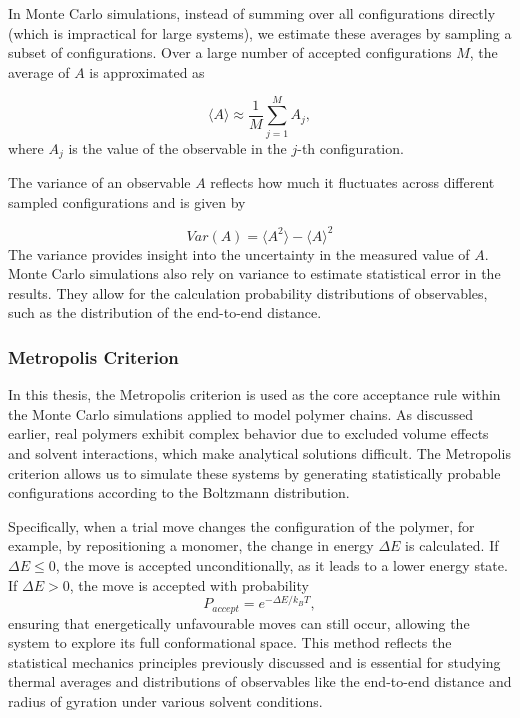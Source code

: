 \documentclass{article}      %
\begin{document}
In Monte Carlo simulations, instead of summing over all configurations directly (which is impractical for large systems), we estimate these averages by sampling a subset of configurations. Over a large number of accepted configurations \( M \), the average of \( A \) is approximated as

\[
\langle A \rangle \approx \frac{1}{M} \sum_{j=1}^M A_j,
\]
where \( A_j \) is the value of the observable in the \( j \)-th configuration.

The variance of an observable \( A \) reflects how much it fluctuates across different sampled configurations and is given by

\[
Var(A) = \langle A^2 \rangle - \langle A \rangle^2
\]
The variance provides insight into the uncertainty in the measured value of \( A \). Monte Carlo simulations also rely on variance to estimate statistical error in the results. They allow for the calculation probability distributions of observables, such as the distribution of the end-to-end distance.



\subsubsection{Metropolis Criterion}

In this thesis, the Metropolis criterion is used as the core acceptance rule within the Monte Carlo simulations applied to model polymer chains. As discussed earlier, real polymers exhibit complex behavior due to excluded volume effects and solvent interactions, which make analytical solutions difficult. The Metropolis criterion allows us to simulate these systems by generating statistically probable configurations according to the Boltzmann distribution.

Specifically, when a trial move changes the configuration of the polymer, for example, by repositioning a monomer, the change in energy \(\Delta E\) is calculated. If \(\Delta E \leq 0\), the move is accepted unconditionally, as it leads to a lower energy state. If \(\Delta E > 0\), the move is accepted with probability
\begin{equation}
P_{accept} = e^{-\Delta E / k_B T},
\end{equation}
ensuring that energetically unfavourable moves can still occur, allowing the system to explore its full conformational space. This method reflects the statistical mechanics principles previously discussed and is essential for studying thermal averages and distributions of observables like the end-to-end distance and radius of gyration under various solvent conditions.
\end{document}
